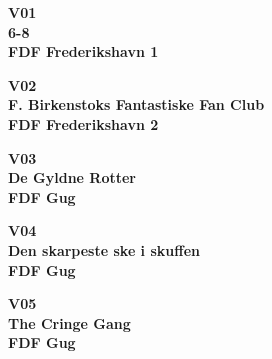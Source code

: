 
\vspace*{2cm}
\begin{center}
{\fontsize{300}{60}\selectfont\textbf{\textcolor{søblå}{V01}}\\}
{\fontsize{30}{50}\selectfont\textbf{\textcolor{søblå}{6-8}}\\}
{\fontsize{20}{50}\selectfont\textbf{FDF Frederikshavn 1}\\}
\end{center}
\newpage

\vspace*{2cm}
\begin{center}
{\fontsize{300}{60}\selectfont\textbf{\textcolor{søblå}{V02}}\\}
{\fontsize{30}{50}\selectfont\textbf{\textcolor{søblå}{F. Birkenstoks Fantastiske Fan Club}}\\}
{\fontsize{20}{50}\selectfont\textbf{FDF Frederikshavn 2}\\}
\end{center}
\newpage

\vspace*{2cm}
\begin{center}
{\fontsize{300}{60}\selectfont\textbf{\textcolor{søblå}{V03}}\\}
{\fontsize{30}{50}\selectfont\textbf{\textcolor{søblå}{De Gyldne Rotter}}\\}
{\fontsize{20}{50}\selectfont\textbf{FDF Gug}\\}
\end{center}
\newpage

\vspace*{2cm}
\begin{center}
{\fontsize{300}{60}\selectfont\textbf{\textcolor{søblå}{V04}}\\}
{\fontsize{30}{50}\selectfont\textbf{\textcolor{søblå}{Den skarpeste ske i skuffen}}\\}
{\fontsize{20}{50}\selectfont\textbf{FDF Gug}\\}
\end{center}
\newpage

\vspace*{2cm}
\begin{center}
{\fontsize{300}{60}\selectfont\textbf{\textcolor{søblå}{V05}}\\}
{\fontsize{30}{50}\selectfont\textbf{\textcolor{søblå}{The Cringe Gang}}\\}
{\fontsize{20}{50}\selectfont\textbf{FDF Gug}\\}
\end{center}
